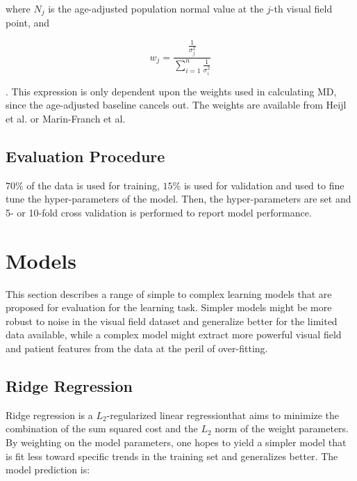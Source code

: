 where $N_j$ is the age-adjusted population normal value at the $j$-th visual field point, and 

\begin{equation}
w_j=\frac{ \frac{1}{\sigma_{j}^2} }{
	\sum\limits_{i=1}^{n} 
	\frac{1}{\sigma_{i}^2} 
}
\end{equation}

. This expression is only dependent upon the weights used in calculating \ac{MD}, since the age-adjusted baseline cancels out. The weights are available from Heijl et al. \cite{Heijl1987} or Marin-Franch et al. \cite{Marin-Franch2013}

\subsection{Evaluation Procedure}

$70\%$ of the data is used for training, $15\%$ is used for validation and used to fine tune the hyper-parameters of the model. Then, the hyper-parameters are set and 5- or 10-fold cross validation is performed to report model performance. 

\section{Models}

This section describes a range of simple to complex learning models that are proposed for evaluation for the learning task. Simpler models might be more robust to noise in the visual field dataset and generalize better for the limited data available, while a complex model might extract more powerful visual field and patient features from the data at the peril of over-fitting. 

\subsection{Ridge Regression}

Ridge regression is a $L_2$-regularized linear regression\footnotemark that aims to minimize the combination of the sum squared cost and the $L_2$ norm of the weight parameters. By weighting on the model parameters, one hopes to yield a simpler model that is fit less toward specific trends in the training set and generalizes better. The model prediction is: 


